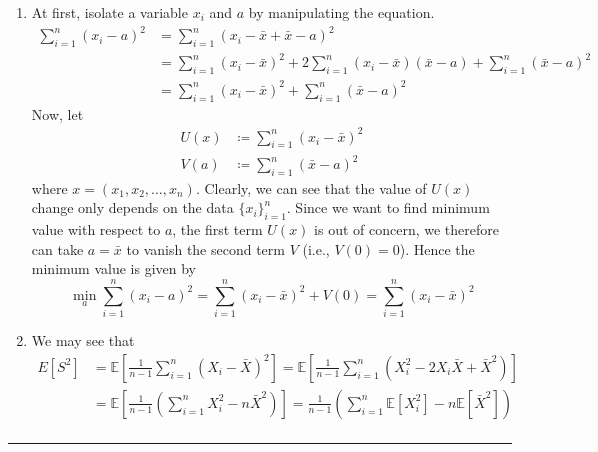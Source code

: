 \documentclass[twoside]{article}
\theoremstyle{definition}
\theoremstyle{remark}
\theoremstyle{remark}
\newenvironment{prf}{{\bf Proof:}}{\hfill\rule{2mm}{2mm}}
\begin{document}
\clearpage
\begin{prf}
  \begin{enumerate}
    \item At first, isolate a variable $x_i$ and $a$ by manipulating the equation.
    \begin{equation*}
      \begin{split}
        \sum_{i=1}^{n} {(x_i - a)}^2
        &= \sum_{i=1}^{n} {(x_i - \bar{x} + \bar{x} - a)}^2 \\
        &= \sum_{i=1}^{n} {(x_i - \bar{x})}^2
         + 2 \sum_{i=1}^{n} (x_i - \bar{x})(\bar{x} - a)
         + \sum_{i=1}^{n} {(\bar{x} - a)}^2 \\
        &= \sum_{i=1}^{n} {(x_i - \bar{x})}^2 + \sum_{i=1}^{n} {(\bar{x} - a)}^2
      \end{split}
    \end{equation*}
    Now, let
    \begin{equation*}
      \begin{split}
        U(x) &\coloneqq \sum_{i=1}^{n} {(x_i - \bar{x})}^2\\
        V(a) &\coloneqq \sum_{i=1}^{n} {(\bar{x} - a)}^2
      \end{split}
    \end{equation*}
    where $x = (x_1, x_2, \ldots, x_n)$. Clearly, we can see that the value of
    $U(x)$ change only depends on the data ${\{x_i\}}_{i=1}^{n}$. Since we want
    to find minimum value with respect to $a$, the first term $U(x)$ is out of
    concern, we therefore can take $a = \bar{x}$ to vanish the second term $V$
    (i.e., $V(0) = 0$). Hence the minimum value is given by
    \begin{equation*}
      \min_{a} \sum_{i=1}^{n} {(x_i - a)}^2
      = \sum_{i=1}^{n} {(x_i - \bar{x})}^2 + V(0)
      = \sum_{i=1}^{n} {(x_i - \bar{x})}^2
    \end{equation*}
    \item We may see that
    \begin{equation*}
      \begin{split}
        E[S^2]
        &= \mathbb{E}\left[ \frac{1}{n-1} \sum_{i=1}^{n} {\left( X_i - \bar{X} \right)}^2 \right]
         = \mathbb{E}\left[ \frac{1}{n-1} \sum_{i=1}^{n} {\left( X_i^2 - 2X_i\bar{X} + \bar{X}^2 \right)} \right] \\
        &= \mathbb{E}\left[ \frac{1}{n-1} \left( \sum_{i=1}^{n} X_i^2 - n \bar{X}^2 \right) \right]
         = \frac{1}{n-1} \left( \sum_{i=1}^{n} \mathbb{E}[X_i^2]
         - n \mathbb{E}[\bar{X}^2] \right) \\

\end{split}
\end{equation*}
\end{enumerate}
\end{prf}
\end{document}
